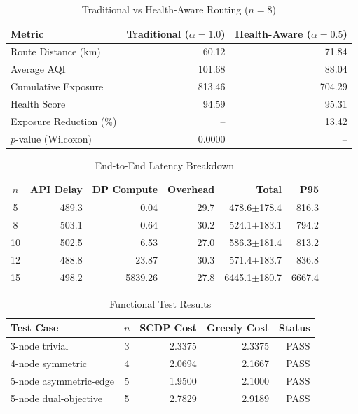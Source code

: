 \begin{table}[htbp]
\centering
\caption{Traditional vs Health-Aware Routing ($n{=}8$)}
\label{tab:trad_vs_health}
\begin{tabular}{lrr}
\hline
Metric & Traditional ($\alpha{=}1.0$) & Health-Aware ($\alpha{=}0.5$) \\
\hline
Route Distance (km) & 60.12 & 71.84 \\
Average AQI & 101.68 & 88.04 \\
Cumulative Exposure & 813.46 & 704.29 \\
Health Score & 94.59 & 95.31 \\
Exposure Reduction (\%) & -- & 13.42 \\
$p$-value (Wilcoxon) & 0.0000 & -- \\
\hline
\end{tabular}
\end{table}

\begin{table}[htbp]
\centering
\caption{End-to-End Latency Breakdown}
\label{tab:latency}
\begin{tabular}{crrrrr}
\hline
$n$ & API Delay & DP Compute & Overhead & Total & P95 \\
\hline
5 & 489.3 & 0.04 & 29.7 & 478.6$\pm$178.4 & 816.3 \\
8 & 503.1 & 0.64 & 30.2 & 524.1$\pm$183.1 & 794.2 \\
10 & 502.5 & 6.53 & 27.0 & 586.3$\pm$181.4 & 813.2 \\
12 & 488.8 & 23.87 & 30.3 & 571.4$\pm$183.7 & 836.8 \\
15 & 498.2 & 5839.26 & 27.8 & 6445.1$\pm$180.7 & 6667.4 \\
\hline
\end{tabular}
\end{table}

\begin{table}[htbp]
\centering
\caption{Functional Test Results}
\label{tab:functional}
\begin{tabular}{lcrrr}
\hline
Test Case & $n$ & SCDP Cost & Greedy Cost & Status \\
\hline
3-node trivial & 3 & 2.3375 & 2.3375 & PASS \\
4-node symmetric & 4 & 2.0694 & 2.1667 & PASS \\
5-node asymmetric-edge & 5 & 1.9500 & 2.1000 & PASS \\
5-node dual-objective & 5 & 2.7829 & 2.9189 & PASS \\
\hline
\end{tabular}
\end{table}

